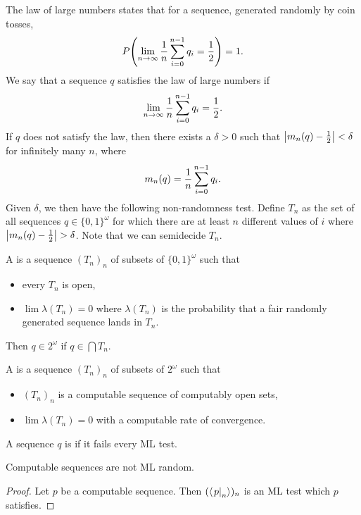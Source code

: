 
The law of large numbers states that for a sequence, generated randomly by coin
tosses,
\[
  P\!\left( \lim_{n \to \infty} \frac{1}{n} \sum_{i=0}^{n-1} q_i = \frac{1}{2} \right)
  = 1.
\]
We say that a sequence $q$ satisfies the law of large numbers if
\[
  \lim_{n \to \infty} \frac{1}{n} \sum_{i=0}^{n-1} q_i = \frac{1}{2}.
\]
If $q$ does not satisfy the law, then there exists a $\delta > 0$ such that
$\left| m_n(q) - \frac{1}{2} \right| < \delta$ for infinitely many $n$, where
\[
  m_n(q) = \frac{1}{n} \sum_{i=0}^{n-1} q_i.
\]
Given $\delta$, we then have the following non-randomness test.
Define $T_n$ as the set of all sequences $q \in \{0,1\}^\omega$ for which there
are at least $n$ different values of $i$ where $\left| m_n(q) - \frac{1}{2} \right| > \delta$.
Note that we can semidecide $T_n$.

\begin{definition}
  A  is a sequence $(T_n)_n$ of subsets of
  $\{0,1\}^\omega$ such that
  \begin{itemize}
  \item every $T_n$ is open,
  \item $\lim \lambda(T_n) = 0$ where $\lambda(T_n)$ is the probability that a
	fair randomly generated sequence lands in $T_n$.
  \end{itemize}
  Then $q \in 2^\omega$  if $q \in \bigcap T_n$.
\end{definition}

\begin{definition}
  A  is a sequence $(T_n)_n$ of subsets of
  $2^\omega$ such that
  \begin{itemize}
  \item $(T_n)_n$ is a computable sequence of computably open sets,
  \item $\lim \lambda(T_n) = 0$ with a computable rate of convergence.
  \end{itemize}
  A sequence $q$ is  if it fails every ML test.
\end{definition}


\begin{proposition}
  Computable sequences are not ML random.
\end{proposition}

\begin{proof}
  Let $p$ be a computable sequence.
  Then $(\left< \left. p \right|_n \right>)_n$ is an ML test which $p$ satisfies.
\end{proof}

